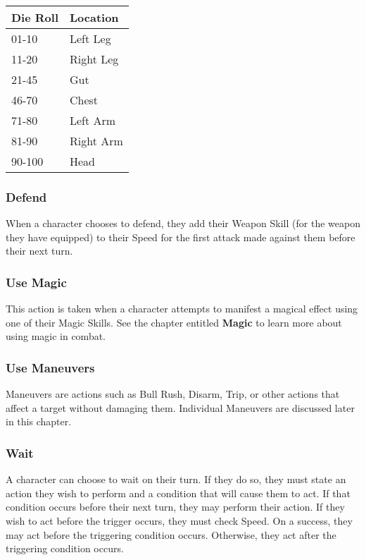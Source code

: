 \documentclass[oneside]{book}
\begin{document}
\begin{multicols}{2}
\begin{center}
\begin{tabular}{|l|l|}
\hline
\rowcolor[HTML]{9B9B9B} 
\textbf{Die Roll} & \textbf{Location} \\ \hline
01-10             & Left Leg          \\ \hline
\rowcolor[HTML]{EFEFEF} 
11-20             & Right Leg         \\ \hline
21-45             & Gut               \\ \hline
\rowcolor[HTML]{EFEFEF} 
46-70             & Chest             \\ \hline
71-80             & Left Arm          \\ \hline
\rowcolor[HTML]{EFEFEF} 
81-90             & Right Arm         \\ \hline
90-100            & Head              \\ \hline
\end{tabular}
\end{center}

\subsubsection{Defend}
When a character chooses to defend, they add their Weapon Skill (for the weapon they have equipped) to their Speed for the first attack made against them before their next turn. 

\subsubsection{Use Magic}
This action is taken when a character attempts to manifest a magical effect using one of their Magic Skills. See the chapter entitled \textbf{Magic} to learn more about using magic in combat.

\subsubsection{Use Maneuvers}
Maneuvers are actions such as Bull Rush, Disarm, Trip, or other actions that affect a target without damaging them. Individual Maneuvers are discussed later in this chapter. 

\subsubsection{Wait}
A character can choose to wait on their turn. If they do so, they must state an action they wish to perform and a condition that will cause them to act. If that condition occurs before their next turn, they may perform their action. If they wish to act before the trigger occurs, they must check Speed. On a success, they may act before the triggering condition occurs. Otherwise, they act after the triggering condition occurs.


\end{multicols}
\end{document}
